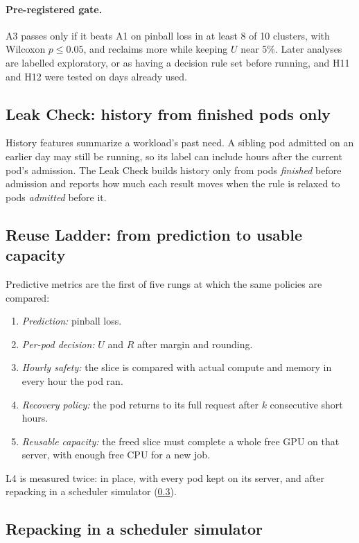 \documentclass[10pt]{article}
\begin{document}
\paragraph{Pre-registered gate.} A3 passes only if it beats A1 on pinball loss in at least 8 of 10 clusters, with Wilcoxon $p \le 0.05$, and reclaims more while keeping $U$ near 5\%. Later analyses are labelled exploratory, or as having a decision rule set before running, and H11 and H12 were tested on days already used.

\subsection{Leak Check: history from finished pods only}
\label{sec:leakcheck}

History features summarize a workload's past need. A sibling pod admitted on an earlier day may still be running, so its label can include hours after the current pod's admission. The Leak Check builds history only from pods \emph{finished} before admission and reports how much each result moves when the rule is relaxed to pods \emph{admitted} before it.

\subsection{Reuse Ladder: from prediction to usable capacity}
\label{sec:ladder}

Predictive metrics are the first of five rungs at which the same policies are compared:
\begin{enumerate}[label=\textbf{L\arabic*.},start=0,leftmargin=2.2em]
  \item \emph{Prediction:} pinball loss.
  \item \emph{Per-pod decision:} $U$ and $R$ after margin and rounding.
  \item \emph{Hourly safety:} the slice is compared with actual compute and memory in every hour the pod ran.
  \item \emph{Recovery policy:} the pod returns to its full request after $k$ consecutive short hours.
  \item \emph{Reusable capacity:} the freed slice must complete a whole free GPU on that server, with enough free CPU for a new job.
\end{enumerate}
L4 is measured twice: in place, with every pod kept on its server, and after repacking in a scheduler simulator (\cref{sec:simmethod}).

\subsection{Repacking in a scheduler simulator}
\label{sec:simmethod}
\end{document}
